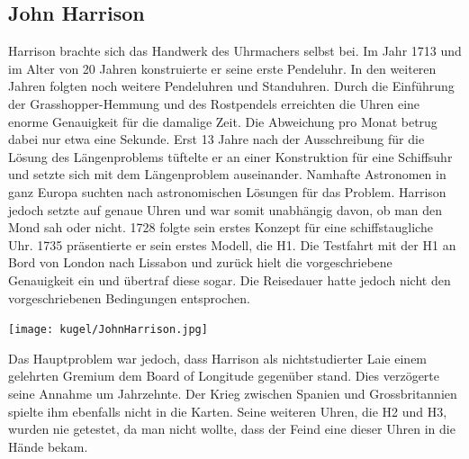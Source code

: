 \begin{refsection}
\subsection{John Harrison}
Harrison brachte sich das Handwerk des Uhrmachers selbst bei. Im Jahr 1713 und im Alter von 20 Jahren konstruierte er seine erste Pendeluhr. In den weiteren Jahren folgten noch weitere Pendeluhren und Standuhren. Durch die Einführung der Grasshopper-Hemmung und des Rostpendels erreichten die Uhren eine enorme Genauigkeit für die damalige Zeit. Die Abweichung pro Monat betrug dabei nur etwa eine Sekunde.
Erst 13 Jahre nach der Ausschreibung für die Lösung des Längenproblems tüftelte er an einer Konstruktion für eine Schiffsuhr und setzte sich mit dem Längenproblem auseinander.
Namhafte Astronomen in ganz Europa suchten nach astronomischen Lösungen für das Problem. Harrison jedoch setzte auf genaue Uhren und war somit unabhängig davon, ob man den Mond sah oder nicht.
1728 folgte sein erstes Konzept für eine schiffstaugliche Uhr. 1735 präsentierte er sein erstes Modell, die H1. Die Testfahrt mit der H1 an Bord von London nach Lissabon und zurück hielt die vorgeschriebene Genauigkeit ein und übertraf diese sogar. Die Reisedauer hatte jedoch nicht den vorgeschriebenen Bedingungen entsprochen.
\begin{center}
        \texttt{[image: kugel/JohnHarrison.jpg]}
\end{center}
Das Hauptproblem war jedoch, dass Harrison als nichtstudierter Laie einem gelehrten Gremium dem Board of Longitude gegenüber stand. Dies verzögerte seine Annahme um Jahrzehnte. Der Krieg zwischen Spanien und Grossbritannien spielte ihm ebenfalls nicht in die Karten. Seine weiteren Uhren, die H2 und H3, wurden nie getestet, da man nicht wollte, dass der Feind eine dieser Uhren in die Hände bekam.


\end{refsection}
